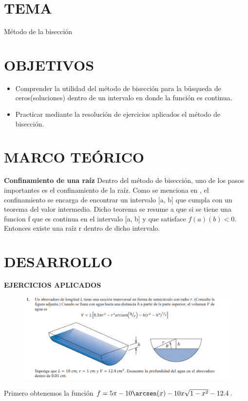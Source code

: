 \documentclass[12pt]{article}
\begin{document}
\section*{TEMA}
Método de la bisección

\vspace{0.5cm}

\section*{OBJETIVOS}
\begin{itemize}
    \item Comprender la utilidad del método de bisección para la búsqueda de ceros(soluciones) dentro de un intervalo en donde la función es continua.
    \item Practicar mediante la resolución de ejercicios aplicados el método de bisección.
\end{itemize}

\vspace{0.5cm}

\section*{MARCO TEÓRICO}

\large\textbf{Confinamiento de una raíz}
\normalsize\newline\newline
Dentro del método de bisección, uno de los pasos importantes es el confinamiento de la raíz. Como se menciona en \cite{sauer2013}, el confinamiento se encarga de encontrar un intervalo [a, b] que cumpla con un teorema del valor intermedio.
Dicho teorema se resume a que si se tiene una funcion f que es continua en el intervalo [a, b]  y que satisface $f(a)(b)<0$. Entonces existe una raíz r dentro de dicho intervalo.
\vspace{0.5cm}

\section*{DESARROLLO}
\large\textbf{EJERCICIOS APLICADOS}
\normalsize
\begin{figure}[H]
    \centering
    \includegraphics[width=1\textwidth]{./inFiles/Figures/Cap1.png}
    \end{figure}
Primero obtenemos la función $ f = 5\pi-10\arcsen(x)-10x\sqrt{1-x^2}-12.4$.
\end{document}

